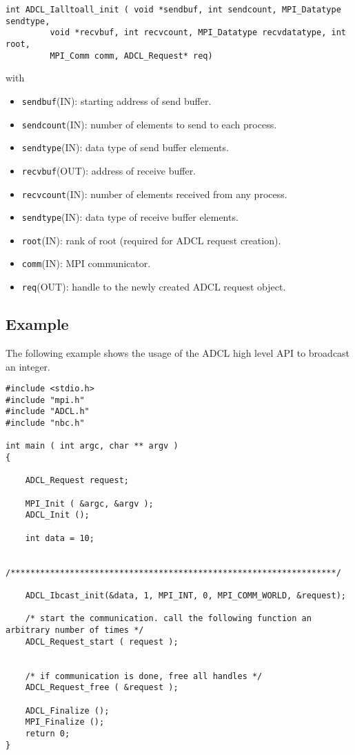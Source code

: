 \begin{verbatim}
int ADCL_Ialltoall_init ( void *sendbuf, int sendcount, MPI_Datatype sendtype,
         void *recvbuf, int recvcount, MPI_Datatype recvdatatype, int root,
         MPI_Comm comm, ADCL_Request* req)
\end{verbatim}
with
\begin{itemize}
\item {\tt sendbuf}(IN): starting address of send buffer.
\item {\tt sendcount}(IN): number of elements to send to each process.
\item {\tt sendtype}(IN): data type of send buffer elements.
\item {\tt recvbuf}(OUT): address of receive buffer.
\item {\tt recvcount}(IN): number of elements received from any process.
\item {\tt sendtype}(IN): data type of receive buffer elements.
\item {\tt root}(IN): rank of root (required for ADCL request creation).
\item {\tt comm}(IN): MPI communicator.
\item {\tt req}(OUT): handle to the newly created ADCL request object.
\end{itemize}

\subsection{Example}

The following example shows the usage of the ADCL high level API to broadcast an integer.

\begin{verbatim}
#include <stdio.h>
#include "mpi.h"
#include "ADCL.h"
#include "nbc.h"

int main ( int argc, char ** argv ) 
{
    
    ADCL_Request request;

    MPI_Init ( &argc, &argv );
    ADCL_Init ();
    
    int data = 10;
    
    /******************************************************************/

    ADCL_Ibcast_init(&data, 1, MPI_INT, 0, MPI_COMM_WORLD, &request);
    
    /* start the communication. call the following function an arbitrary number of times */ 
    ADCL_Request_start ( request );


    /* if communication is done, free all handles */
    ADCL_Request_free ( &request );
    
    ADCL_Finalize ();
    MPI_Finalize ();
    return 0;
}
\end{verbatim}